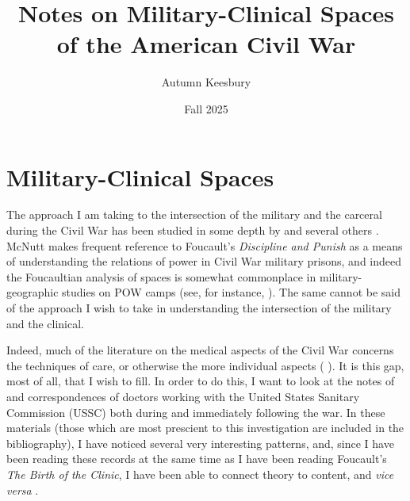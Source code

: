 \documentclass{report}
\title{Notes on Military-Clinical Spaces of the American Civil War}
\author{Autumn Keesbury}
\date{Fall 2025}
\begin{document}
  \maketitle

  \newpage
  \renewcommand\thepage{\romannumeral\numexpr\value{page}-1\relax}
  \tableofcontents
  \newpage


  \pagestyle{fancy}

  \chapter{Military-Clinical Spaces}\label{chap: 1} %
  
  The approach I am taking to the intersection of the military and the carceral during the Civil War has been studied in some depth by \citeauthor{McNutt2024}
  and several others \autocites{McNutt2024}{McNutt2021}{McNutt2019}{McNutt2019a}. McNutt makes frequent reference to Foucault's \textit{Discipline and Punish} as a 
  means of understanding the relations of power in Civil War military prisons, and indeed the Foucaultian analysis of spaces is somewhat commonplace in military-geographic studies on POW camps (see, for instance, \citeauthor{Moran2022}). The same cannot be said of the approach I wish to take in understanding the
  intersection of the military and the clinical.

  Indeed, much of the literature on the medical aspects of the Civil War concerns the techniques of care, or otherwise the more individual aspects 
  (\citeauthor{Devine2016} ). It is this gap, most of all, that I wish to fill. In order to do this, I want to look at the notes of and
  correspondences of doctors working with the United States Sanitary Commission (USSC) both during and immediately following the war. In these materials 
  (those which are most prescient to this investigation are included in the bibliography), I have noticed several very interesting patterns, and, since I have
  been reading these records at the same time as I have been reading Foucault's \textit{The Birth of the Clinic}, I have been able to connect theory to
  content, and \textit{vice versa} \autocite{Foucault1994}.
\end{document}
